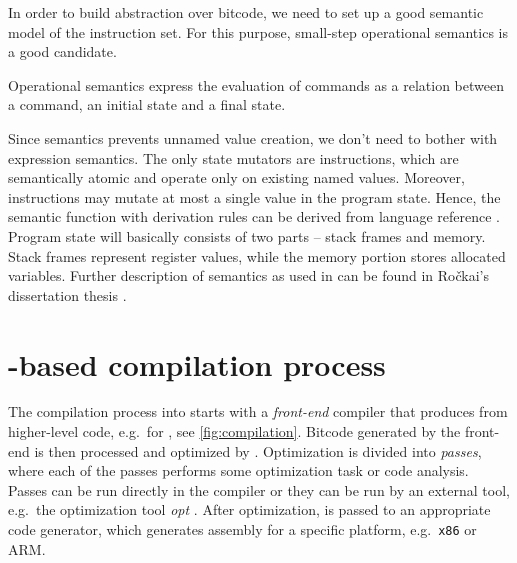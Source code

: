 In order to build abstraction over \LLVM bitcode, we need to set up a good
semantic model of the instruction set. For this purpose, small-step operational
semantics \cite{Plotkin04} is a good candidate.

\begin{definition}
Operational semantics express the evaluation of commands as a relation between
a command, an initial state and a final state.
\end{definition}

\noindent
Since \LLVMIR semantics prevents unnamed value creation, we don't need to
bother with expression semantics. The only state mutators are instructions, which are
semantically atomic and operate only on existing named values. Moreover,
instructions may mutate at most a single value in the program state. Hence, the
semantic function with derivation rules can be derived from \LLVM
language reference \cite{LLVM:langref}. Program state will basically
consists of two parts -- stack frames and memory. Stack frames represent
register values, while the memory portion stores allocated variables.
Further description of \LLVM semantics as used in \DIVINE can be found in Ročkai's
dissertation thesis \cite{Rockai15}.

\section{\LLVM-based compilation process} \label{sec:compilation}

The compilation process into \LLVM starts with a \emph{front-end} compiler that produces
\LLVMIR from higher-level code, e.g.~\clang for \Cpp{}, see \autoref{fig:compilation}.
Bitcode generated by the front-end is then processed and optimized by \LLVM.
Optimization is divided into \LLVM \emph{passes}, where each of the passes
performs some optimization task or code analysis. Passes can be run directly
in the compiler or they can be run by an external tool, e.g.~the \LLVM
optimization tool \emph{opt} \cite{LLVM:opt}. After optimization, \LLVMIR is passed to
an appropriate code generator, which generates assembly for a specific
platform, e.g.~\texttt{x86} or ARM.

